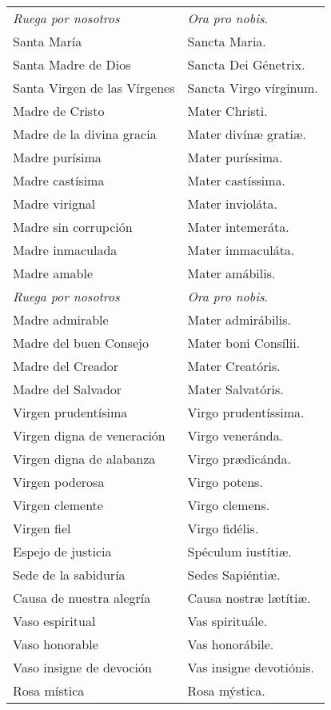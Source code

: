 \documentclass[./main.tex]{subfiles}
\begin{document}
\begin{longtable} { p{} p{} }
    \textit{\color{red}Ruega por nosotros} & \textit{\color{red}Ora pro nobis}.\\
    Santa María & Sancta Maria.\\
    Santa Madre de Dios & Sancta Dei Génetrix.\\
    Santa Virgen de las Vírgenes & Sancta Virgo vírginum.\\
    Madre de Cristo & Mater Christi.\\
    Madre de la divina gracia & Mater divín{\ae} gratiæ.\\
    Madre purísima & Mater puríssima.\\
    Madre castísima & Mater castíssima.\\
    Madre virignal & Mater invioláta.\\
    Madre sin corrupción & Mater intemeráta.\\
    Madre inmaculada & Mater immaculáta.\\
    Madre amable & Mater amábilis.\\
    \textit{\color{red}Ruega por nosotros} & \textit{\color{red}Ora pro nobis}.\\ 
    Madre admirable & Mater admirábilis.\\   
    Madre del buen Consejo & Mater boni Consílii.\\
    Madre del Creador & Mater Creatóris.\\
    Madre del Salvador & Mater Salvatóris.\\
    Virgen prudentísima & Virgo pru­den­tíssima.\\
    Virgen digna de veneración & Virgo veneránda.\\
    Virgen digna de alabanza & Virgo pr{\ae}dicánda.\\
    Virgen poderosa & Virgo potens.\\
    Virgen clemente & Virgo clemens.\\
    Virgen fiel & Virgo fidélis.\\
    Espejo de justicia & Spéculum iustítiæ.\\
    Sede de la sabiduría & Sedes Sapiéntiæ.\\
    Causa de nuestra alegría & Causa nostræ l{\ae}títiæ.\\
    Vaso espiritual & Vas spirituále.\\
    Vaso honorable & Vas honorábile.\\
    Vaso insigne de devoción & Vas insigne devotiónis.\\
    Rosa mística & Rosa mýstica.\\

\end{longtable}
\end{document}
